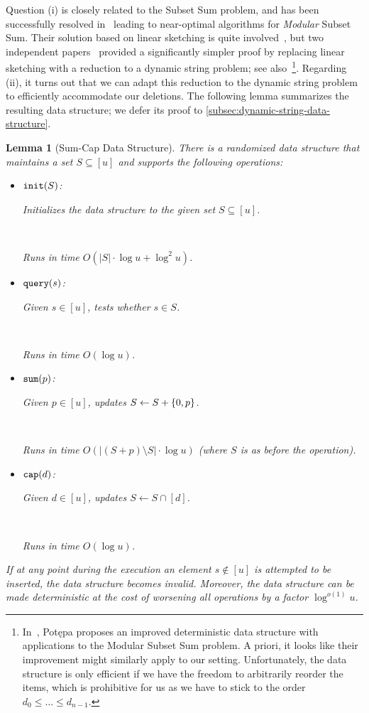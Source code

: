 \documentclass[10pt,a4paper]{article}
\newtheorem{lemma}{Lemma}[section]
\DeclarePairedDelimiter\set{\lbrace}{\rbrace}
\newcommand\order{o}
\newcommand\Oo{O}
\newcommand{\Op}[1]{{\normalfont\texttt{#1}}}
\begin{document}
Question (i) is closely related to the Subset Sum problem, and has been successfully resolved in~\cite{AxiotisBJTW19} leading to near-optimal algorithms for \emph{Modular} Subset Sum. Their solution based on linear sketching is quite involved~\cite{AxiotisBJTW19}, but two independent papers~\cite{AxiotisBBJNTW21,CardinalI21} provided a significantly simpler proof by replacing linear sketching with a reduction to a dynamic string problem; see also~\cite{Potepa21}\footnote{In~\cite{Potepa21}, Pot\k{e}pa proposes an improved deterministic data structure with applications to the Modular Subset Sum problem. A priori, it looks like their improvement might similarly apply to our setting. Unfortunately, the data structure is only efficient if we have the freedom to arbitrarily reorder the items, which is prohibitive for us as we have to stick to the order $d_0 \leq \dots \leq d_{n-1}$.}. Regarding (ii), it turns out that we can adapt this reduction to the dynamic string problem to efficiently accommodate our deletions. The following lemma summarizes the resulting data structure; we defer its proof to \cref{subsec:dynamic-string-data-structure}.

\begin{lemma}[Sum-Cap Data Structure]
    \label{lem:set_ds}
    There is a randomized data structure that maintains a set $S \subseteq [u]$ and supports the following operations:
    \smallskip
    \begin{itemize} 
        \item \parbox{2.2cm}{$\Op{init}(S)$:} Initializes the data structure to the given set $S \subseteq [u]$.\\\parbox{2.2cm}{~} Runs in time $\Oo(|S| \cdot \log u + \log^2 u)$.
        
        \item \parbox{2.2cm}{$\Op{query}(s)$:} Given $s \in [u]$, tests whether $s \in S$.\\\parbox{2.2cm}{~} Runs in time $\Oo(\log u)$.
        
        \item \parbox{2.2cm}{$\Op{sum}(p)$:} Given $p \in [u]$, updates $S \gets S + \set{0, p}$.\\\parbox{2.2cm}{~} Runs in time $\Oo(|(S+p)\setminus S| \cdot \log u)$ (where $S$ is as before the operation).

        \item \parbox{2.2cm}{$\Op{cap}(d)$:} Given $d \in [u]$, updates $S \gets S \cap [d]$.\\\parbox{2.2cm}{~} Runs in time $\Oo(\log u)$.
    \end{itemize}
    \smallskip
    If at any point during the execution an element $s \notin [u]$ is attempted to be inserted, the data structure becomes invalid. Moreover, the data structure can be made deterministic at the cost of worsening all operations by a factor $\log^{\order(1)} u$.
\end{lemma}
\end{document}
